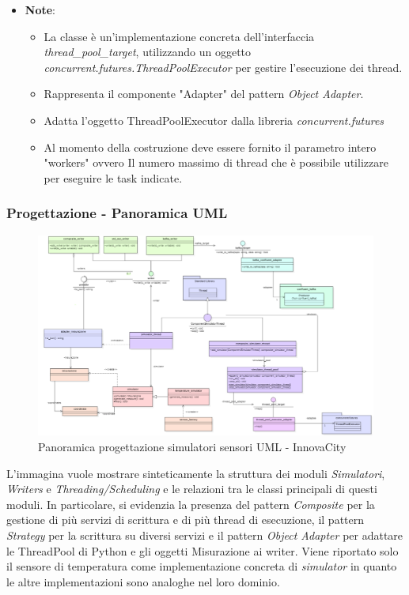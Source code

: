 \begin{itemize}
\begin{itemize}
        \item\textbf{Note}:
        \begin{itemize}
            \item La classe è un'implementazione concreta dell'interfaccia \textit{thread\_pool\_target}, utilizzando un oggetto \textit{concurrent.futures.ThreadPoolExecutor} per gestire l'esecuzione dei thread.
            \item Rappresenta il componente "Adapter" del pattern \textit{Object Adapter}.
            \item Adatta l'oggetto ThreadPoolExecutor dalla libreria \textit{concurrent.futures}
            \item Al momento della costruzione deve essere fornito il parametro intero "workers" ovvero
            Il numero massimo di thread che è possibile utilizzare per eseguire le task indicate.
        \end{itemize}
    \end{itemize}
\end{itemize}


\subsubsection{Progettazione - Panoramica UML }
\begin{figure}[H]
    \centering
    \includegraphics[width=1.1\textwidth]{../Images/SpecificaTecnica/progettazioneCompSimulatori.PNG}
    \caption{Panoramica progettazione simulatori sensori UML - InnovaCity}
    \label{fig: panor_sim}
\end{figure}
L'immagina vuole mostrare sinteticamente la struttura dei moduli \textit{Simulatori}, \textit{Writers} e \textit{Threading/Scheduling} e le relazioni tra le classi principali di questi moduli. In particolare, si evidenzia la presenza del pattern \textit{Composite} per la gestione di più servizi di scrittura e di più thread di esecuzione, il pattern \textit{Strategy} per la scrittura su diversi servizi e il pattern \textit{Object Adapter} per adattare le ThreadPool di Python e gli oggetti Misurazione ai writer. 
Viene riportato solo il sensore di temperatura come implementazione concreta di \textit{simulator} in quanto le altre implementazioni sono analoghe nel loro dominio.